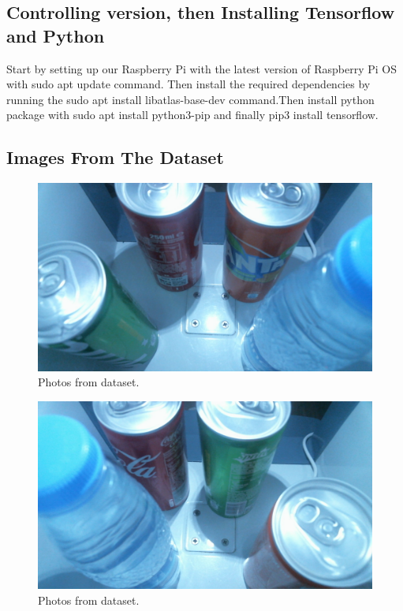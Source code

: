 \subsection{Controlling version, then Installing Tensorflow and Python}
Start by setting up our Raspberry Pi with the latest version of Raspberry Pi OS with sudo apt update command.
Then install the required dependencies by running the sudo apt install libatlas-base-dev command.Then install python package with sudo apt install python3-pip and finally pip3 install tensorflow.

\subsection{Images From The Dataset}

\begin{figure}[!htbp]
    \centering
    \includegraphics[width=1\textwidth]{Imgs/datasetphotos1.jpg}
    \caption{\label{fig:pic1}Photos from dataset.}
\end{figure}
\begin{figure}[!htbp]
    \centering
    \includegraphics[width=1\textwidth]{Imgs/datasetphotos2.jpg}
    \caption{\label{fig:pic2}Photos from dataset.}
\end{figure}
